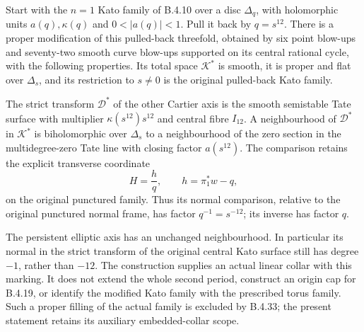 \begin{proposition}
Start with the $n=1$ Kato family of B.4.10 over a disc
$\Delta_q$, with holomorphic units $a(q),\kappa(q)$ and
$0<|a(q)|<1$.  Pull it back by $q=s^{12}$.
There is a proper modification of this pulled-back threefold,
obtained by six point blow-ups and seventy-two smooth curve
blow-ups supported on its central rational cycle, with the
following properties.  Its total space $\mathcal K^*$ is smooth,
it is proper and flat over $\Delta_s$, and its restriction to
$s\ne0$ is the original pulled-back Kato family.

The strict transform $\mathcal D^*$ of the other Cartier axis
is the smooth semistable Tate surface with multiplier
$\kappa(s^{12})s^{12}$ and central fibre $I_{12}$.  A neighbourhood
of $\mathcal D^*$ in $\mathcal K^*$ is biholomorphic over
$\Delta_s$ to a neighbourhood of the zero section in the
multidegree-zero Tate line with closing factor $a(s^{12})$.
The comparison retains the explicit transverse coordinate
\[
 H=\frac{h}{q},\qquad h=\pi_1^*w-q,
 \tag{B.4.21.1}
\]
on the original punctured family.  Thus its normal comparison,
relative to the original punctured normal frame, has factor
$q^{-1}=s^{-12}$; its inverse has factor $q$.

The persistent elliptic axis has an unchanged neighbourhood.
In particular its normal in the strict transform of the original
central Kato surface still has degree $-1$, rather than $-12$.
The construction supplies an actual linear collar with this
marking.  It does not extend the whole second period, construct
an origin cap for B.4.19, or identify the modified Kato family
with the prescribed torus family. Such a proper filling of
the actual family is excluded by B.4.33; the present
statement retains its auxiliary embedded-collar scope.
\end{proposition}
